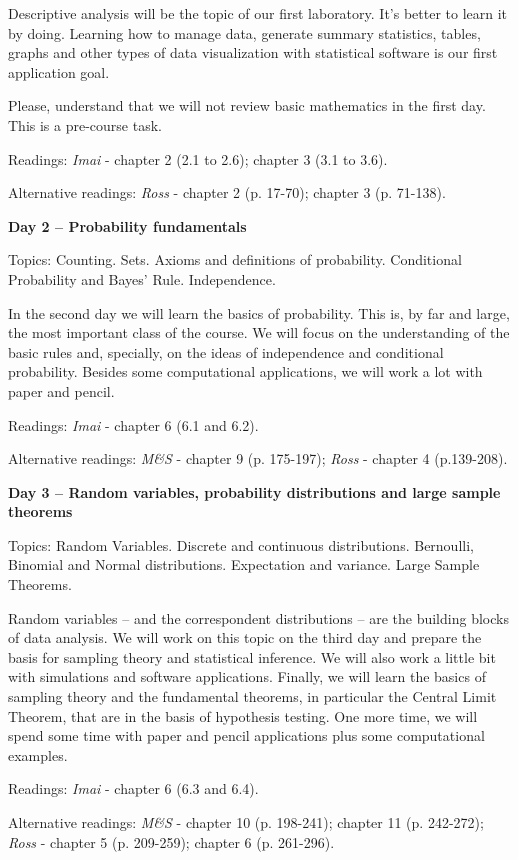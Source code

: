 \documentclass[a4paper,11pt]{article}
\begin{document}
Descriptive analysis will be the topic of our first laboratory. It's better to learn it by doing. Learning how to manage data, generate summary statistics, tables, graphs and other types of data visualization with statistical software is our first application goal.

Please, understand that we will not review basic mathematics in the first day. This is a pre-course task.

Readings: \emph{Imai} - chapter 2 (2.1 to 2.6); chapter 3 (3.1 to 3.6).

Alternative readings: \emph{Ross} - chapter 2 (p. 17-70); chapter 3 (p. 71-138).

\textbf{Day 2 -- Probability fundamentals}

Topics: Counting. Sets. Axioms and definitions of probability. Conditional Probability and Bayes' Rule. Independence.

In the second day we will learn the basics of probability. This is, by far and large, the most important class of the course. We will focus on the understanding of the basic rules and, specially, on the ideas of independence and conditional probability. Besides some computational applications, we will work a lot with paper and pencil.

Readings: \emph{Imai} - chapter 6 (6.1 and 6.2).

Alternative readings: \emph{M\&S} - chapter 9 (p. 175-197); \emph{Ross} - chapter 4 (p.139-208).

\textbf{Day 3 -- Random variables, probability distributions and large sample theorems}

Topics: Random Variables. Discrete and continuous distributions. Bernoulli, Binomial and Normal distributions. Expectation and variance. Large Sample Theorems.

Random variables -- and the correspondent distributions -- are the building blocks of data analysis. We will work on this topic on the third day and prepare the basis for sampling theory and statistical inference. We will also work a little bit with simulations and software applications. Finally, we will learn the basics of sampling theory and the fundamental theorems, in particular the Central Limit Theorem, that are in the basis of hypothesis testing. One more time, we will spend some time with paper and pencil applications plus some computational examples.

Readings: \emph{Imai} - chapter 6 (6.3 and 6.4).

Alternative readings: \emph{M\&S} - chapter 10 (p. 198-241); chapter 11 (p. 242-272); \emph{Ross} - chapter 5 (p. 209-259); chapter 6 (p. 261-296).
\end{document}
